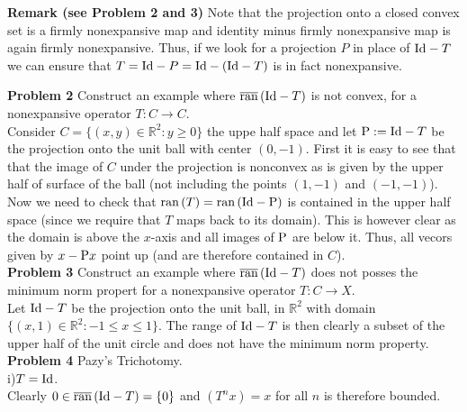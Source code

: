 \documentclass{scrartcl}
\newcommand{\R}{\mathbb{R}}
\theoremstyle{plain}
\theoremstyle{remark}
\newcommand{\Id}{\textup{Id}}
\renewcommand{\P}{\textup{P}}
\newcommand{\ran}{\textup{ran}\,}
\newcommand{\clran}{\overline{\textup{ran}}\,}
\begin{document}
\textbf{Remark (see Problem 2 and 3)} 
Note that the projection onto a closed convex set is a firmly nonexpansive map and identity minus firmly nonexpansive map is again firmly nonexpansive.
Thus, if we look for a projection $P$ in place of $\Id - T$ we can ensure that $T = \Id - P = \Id - (\Id - T)$ is in fact nonexpansive.

\textbf{Problem 2} Construct an example where $\clran(\Id - T)$ is not convex, for a nonexpansive operator $T:C \to C$.\\
Consider $C= \{(x,y) \in \R^2 : y \ge 0 \}$ the uppe half space and let $\P := \Id - T$ be the projection onto the unit ball with center $(0,-1)$.
First it is easy to see that that the image of $C$ under the projection is nonconvex as is given by the upper half of surface of the ball (not including the points $(1,-1)$ and $(-1,-1)$).
Now we need to check that $\ran(T) = \ran (\Id - \P)$ is contained in the upper half space (since we require that $T$ maps back to its domain).
This is however clear as the domain is above the $x$-axis and all images of $\P$ are below it. Thus, all vecors given by $x - \P x$ point up (and are therefore contained in $C$). \\

\textbf{Problem 3} Construct an example where $\clran(\Id - T)$ does not posses the minimum norm propert for a nonexpansive operator $T:C \to X$. \\
Let $\Id - T$ be the projection onto the unit ball, in $\R^2$ with domain $\{(x, 1) \in \R^2 : -1 \le x\le 1\}$.
The range of $\Id - T$ is then clearly a subset of the upper half of the unit circle and does not have the minimum norm property. \\


\textbf{Problem 4} Pazy's Trichotomy.\\
i)$T=\Id$.\\
Clearly $0 \in \clran(\Id - T) = \{0\}$ and $(T^{n}x) = x$ for all $n$ is therefore bounded.
\end{document}
